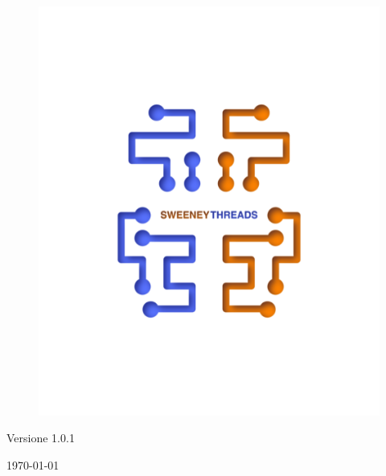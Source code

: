 \documentclass[a4paper]{article}
\begin{document}
\begin{titlepage}
		\begin{figure}[H]
			\centering
			\includegraphics[scale=0.8]{sweeney.png}
		\end{figure}
		\begin{center}
			Versione 1.0.1
		\end{center}
		{\large \today}\\[3cm]
		\vfill
	\end{titlepage}


	\tableofcontents

	\newpage
\end{document}
